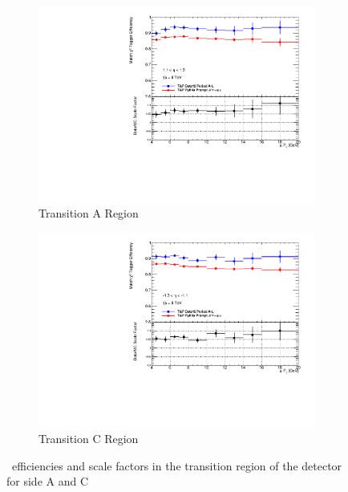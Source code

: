 \begin{figure}[tbhp]
  \centering
  \begin{subfigure}[b]{0.85\textwidth}
    \includegraphics[width=\textwidth]{PartCalibration2012/Plots/SFPlots/Transition_A_smt.pdf}
    \caption{Transition A Region} \label{fig:CalibrationScaleFactorTransitionA}
  \end{subfigure}
  
  \begin{subfigure}[b]{0.85\textwidth}
    \includegraphics[width=\textwidth]{PartCalibration2012/Plots/SFPlots/Transition_C_smt.pdf}
    \caption{Transition C Region} \label{fig:CalibrationScaleFactorTransitionC}
  \end{subfigure}
  \caption{\xsm\ efficiencies and scale factors in the transition region of the detector for side  A and  C} \label{fig:CalibrationScaleFactorTransition}
\end{figure}

